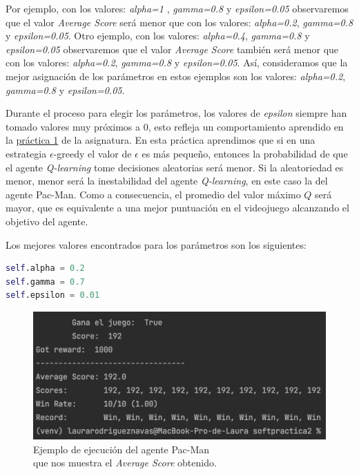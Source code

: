 \documentclass[11pt]{exam}
\begin{document}
Por ejemplo, con los valores: \textit{alpha=1} , \textit{gamma=0.8} y \textit{epsilon=0.05} observaremos que el valor \textit{Average Score} será menor que con los valores: \textit{alpha=0.2}, \textit{gamma=0.8} y \textit{epsilon=0.05}. Otro ejemplo, con los valores: \textit{alpha=0.4}, \textit{gamma=0.8} y \textit{epsilon=0.05} observaremos que el valor \textit{Average Score} también será menor que con los valores: \textit{alpha=0.2}, \textit{gamma=0.8} y \textit{epsilon=0.05}. Así, consideramos que la mejor asignación de los parámetros en estos ejemplos son los valores: \textit{alpha=0.2}, \textit{gamma=0.8} y \textit{epsilon=0.05}.
\vspace*{2mm}

Durante el proceso para elegir los parámetros, los valores de \textit{epsilon} siempre han tomado valores muy próximos a 0, esto refleja un comportamiento aprendido en la \href{https://poliformat.upv.es/portal/site/ESP_0_2835/tool/c07b745a-0cfd-44f0-a7a2-9bb22f80c3f7?panel=Main}{práctica 1} de la asignatura. En esta práctica aprendimos que si en una estrategia $\epsilon$-greedy el valor de $\epsilon$ es más pequeño, entonces la probabilidad de que el agente \textit{Q-learning} tome decisiones aleatorias será menor. Si la aleatoriedad es menor, menor será la inestabilidad del agente \textit{Q-learning}, en este caso la del agente Pac-Man. Como a consecuencia, el promedio del valor máximo $Q$ será mayor, que es equivalente a una mejor puntuación en el videojuego alcanzando el objetivo del agente.
\vspace*{3mm}

Los mejores valores encontrados para los parámetros son los siguientes:
\vspace*{3mm}

\begin{lstlisting}[language=python, basicstyle=\footnotesize]
self.alpha = 0.2
self.gamma = 0.7
self.epsilon = 0.01
\end{lstlisting}

\begin{figure}[H]
	\centering
	\includegraphics[scale=0.6]{average_score}
	\caption{Ejemplo de ejecución del agente Pac-Man \\ que nos muestra el \textit{Average Score} obtenido.}
	\label{average_score}
\end{figure}
\end{document}
